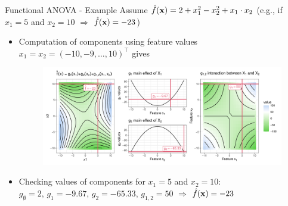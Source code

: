 \documentclass[11pt,compress,t,notes=noshow, aspectratio=169, xcolor=table]{beamer}
\newcommand{\open}{}
\newcommand{\close}{}
\begin{document}
\begin{frame}{Functional ANOVA - Example}
Assume $\fh(\xv) = 2 + x_1^2 - x_2^2 + x_1 \cdot x_2$ (e.g., if $x_1 = 5$ and $x_2 = 10$ $\Rightarrow$ $\fh(\xv) = -23$)

\begin{itemize}
    \item Computation of components using feature values $x_1 = x_2 = (-10, -9, \ldots, 10)^\top$ gives
    \begin{figure}
    \includegraphics[width = 0.7 \textwidth]{figure/interaction2}
    \end{figure}
    \item Checking values of components for $x_1 = 5$ and $x_2 = 10$:\\
    $g_{\open \emptyset \close} = 2$, $g_{\open 1 \close} = -9.67$, $g_{\open 2 \close} = -65.33$, $g_{\open 1,2 \close} = 50$ $\Rightarrow$ $\fh(\xv) = -23$
\end{itemize} 


\end{frame}


\end{document}
